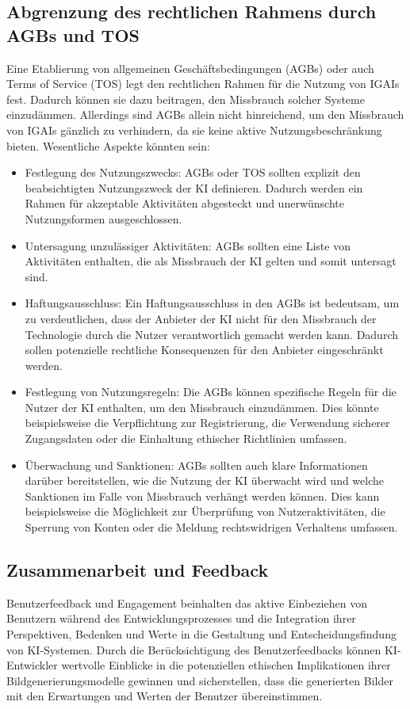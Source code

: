 \documentclass[12pt]{report}
\begin{document}
\subsection{Abgrenzung des rechtlichen Rahmens durch AGBs und TOS}
Eine Etablierung von allgemeinen Geschäftsbedingungen (AGBs) oder auch Terms of Service (TOS) legt den rechtlichen Rahmen für die Nutzung von IGAIs fest. Dadurch können sie dazu beitragen, den Missbrauch solcher Systeme einzudämmen. 
Allerdings sind AGBs allein nicht hinreichend, um den Missbrauch von IGAIs gänzlich zu verhindern, da sie keine aktive Nutzungsbeschränkung bieten. Wesentliche Aspekte könnten sein:
\begin{itemize}
    \item Festlegung des Nutzungszwecks: AGBs oder TOS sollten explizit den beabsichtigten Nutzungszweck der KI definieren. Dadurch werden ein Rahmen für akzeptable Aktivitäten abgesteckt und unerwünschte Nutzungsformen ausgeschlossen.
    \item Untersagung unzulässiger Aktivitäten: AGBs sollten eine Liste von Aktivitäten enthalten, die als Missbrauch der KI gelten und somit untersagt sind.
    \item Haftungsausschluss: Ein Haftungsausschluss in den AGBs ist bedeutsam, um zu verdeutlichen, dass der Anbieter der KI nicht für den Missbrauch der Technologie durch die Nutzer verantwortlich gemacht werden kann. Dadurch sollen potenzielle rechtliche Konsequenzen für den Anbieter eingeschränkt werden.
    \item Festlegung von Nutzungsregeln: Die AGBs  können spezifische Regeln für die Nutzer der KI enthalten, um den Missbrauch einzudämmen. Dies könnte beispielsweise die Verpflichtung zur Registrierung, die Verwendung sicherer Zugangsdaten oder die Einhaltung ethischer Richtlinien umfassen.
    \item Überwachung und Sanktionen: AGBs sollten auch klare Informationen darüber bereitstellen, wie die Nutzung der KI überwacht wird und welche Sanktionen im Falle von Missbrauch verhängt werden können. Dies kann beispielsweise die Möglichkeit zur Überprüfung von Nutzeraktivitäten, die Sperrung von Konten oder die Meldung rechtswidrigen Verhaltens umfassen.
\end{itemize}

\subsection{Zusammenarbeit und Feedback}
Benutzerfeedback und Engagement beinhalten das aktive Einbeziehen von Benutzern während des Entwicklungsprozesses und die Integration ihrer Perspektiven, Bedenken und Werte in die Gestaltung und Entscheidungsfindung von KI-Systemen. Durch die Berücksichtigung des Benutzerfeedbacks können KI-Entwickler wertvolle Einblicke in die potenziellen ethischen Implikationen ihrer Bildgenerierungsmodelle gewinnen und sicherstellen, dass die generierten Bilder mit den Erwartungen und Werten der Benutzer übereinstimmen.
\end{document}
